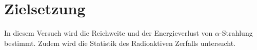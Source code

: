 \section{Zielsetzung}
\label{sec:Zielsetzung}
In diesem Versuch wird die Reichweite und der Energieverlust von $\alpha$-Strahlung bestimmt.
Zudem wird die Statistik des Radioaktiven Zerfalls untersucht.